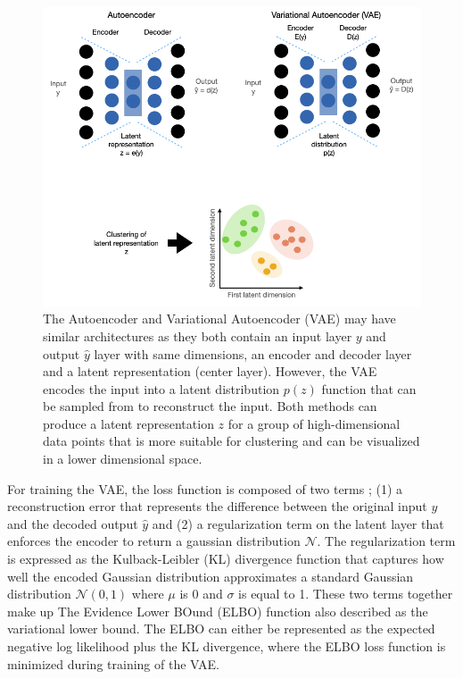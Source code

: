 \begin{figure}[H]
  \begin{center}
    \includegraphics[scale=1, width=1\textwidth]{pictures/VAE.png}
  \end{center}
  \caption[VirusTimeline]{The Autoencoder and Variational Autoencoder (VAE) may have similar architectures as they both contain an input layer $y$ and output $\hat{y}$ layer with same dimensions, an encoder and decoder layer and a latent representation (center layer). However, the VAE encodes the input into a latent distribution $p(z)$ function that can be sampled from to reconstruct the input. Both methods can produce a latent representation $z$ for a group of high-dimensional data points that is more suitable for clustering and can be visualized in a lower dimensional space.
  }
  \label{fig:VAE}
\end{figure}

\noindent
For training the VAE, the loss function is composed of two terms \cite{Doersch2016-bo}; (1) a reconstruction error that represents the difference between the original input $y$ and the decoded output $\hat{y}$ and (2) a regularization term on the latent layer that enforces the encoder to return a gaussian distribution $\mathcal{N}$. The regularization term is expressed as the Kulback-Leibler (KL) divergence function that captures how well the encoded Gaussian distribution approximates a standard Gaussian distribution $\mathcal{N}(0,1)$ where $\mu$ is 0 and $\sigma$ is equal to 1. These two terms together make up The Evidence Lower BOund (ELBO) function also described as the variational lower bound. The ELBO can either be represented as the expected negative log likelihood plus the KL divergence, where the ELBO loss function is minimized during training of the VAE.

